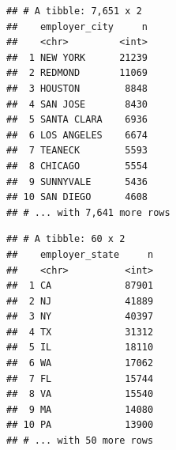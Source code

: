 \documentclass[]{article}
\newenvironment{Shaded}{\begin{snugshade}}{\end{snugshade}}
\newcommand{\KeywordTok}[1]{\textcolor[rgb]{0.13,0.29,0.53}{\textbf{#1}}}
\newcommand{\DataTypeTok}[1]{\textcolor[rgb]{0.13,0.29,0.53}{#1}}
\newcommand{\StringTok}[1]{\textcolor[rgb]{0.31,0.60,0.02}{#1}}
\newcommand{\CommentTok}[1]{\textcolor[rgb]{0.56,0.35,0.01}{\textit{#1}}}
\newcommand{\OperatorTok}[1]{\textcolor[rgb]{0.81,0.36,0.00}{\textbf{#1}}}
\newcommand{\NormalTok}[1]{#1}
\begin{document}
\begin{Shaded}
\end{Shaded}

\begin{verbatim}
## # A tibble: 7,651 x 2
##    employer_city     n
##    <chr>         <int>
##  1 NEW YORK      21239
##  2 REDMOND       11069
##  3 HOUSTON        8848
##  4 SAN JOSE       8430
##  5 SANTA CLARA    6936
##  6 LOS ANGELES    6674
##  7 TEANECK        5593
##  8 CHICAGO        5554
##  9 SUNNYVALE      5436
## 10 SAN DIEGO      4608
## # ... with 7,641 more rows
\end{verbatim}

\begin{Shaded}
\end{Shaded}

\begin{verbatim}
## # A tibble: 60 x 2
##    employer_state     n
##    <chr>          <int>
##  1 CA             87901
##  2 NJ             41889
##  3 NY             40397
##  4 TX             31312
##  5 IL             18110
##  6 WA             17062
##  7 FL             15744
##  8 VA             15540
##  9 MA             14080
## 10 PA             13900
## # ... with 50 more rows
\end{verbatim}

\begin{Shaded}
\end{Shaded}
\end{document}
